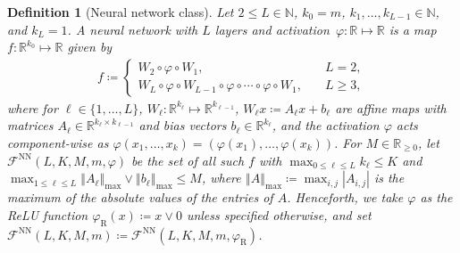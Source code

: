 \documentclass[a4paper,onecolumn,11pt,accepted=2026-05-12]{quantumarticle}
\newtheorem{definition}{Definition}
\newcommand{\norm}[1]{\left\Vert#1\right\Vert}
\newcommand{\abs}[1]{\left\vert#1\right\vert}
\newcommand{\cF}{\mathcal{F}}
\newcommand{\NN}{\mathbb{N}}
\newcommand{\RR}{\mathbb{R}}
\begin{document}
\begin{definition}[Neural network class]\label{Def:NNclass}
    Let $2 \leq L \in \NN$,  $k_0=m$, $k_1, \ldots, k_{L-1} \in \NN$,  and $ k_L=1 $.  
    A neural network with $L$ layers and activation~$\varphi\colon \RR \mapsto \RR$ is a map $f\colon \RR^{k_0} \mapsto \RR$ 
    given by 
    \begin{align}
        f\coloneqq \begin{cases}
            W_2\circ \varphi \circ W_1, &\quad L=2, \\
            W_L \circ \varphi \circ W_{L-1} \circ \varphi \circ \cdots \circ \varphi \circ W_1, & \quad L \geq 3,
        \end{cases}
    \end{align}
    where for $\ell \in \{1,\ldots,L\}$, $W_{\ell}\colon \RR^{k_{\ell}} \mapsto \RR^{k_{\ell-1}}$, $W_{\ell}x\coloneqq A_{\ell}x+b_{\ell}$ are affine maps with matrices $A_{\ell} \in \RR^{k_{\ell} \times k_{\ell-1}}$ and bias vectors $b_{\ell} \in \RR^{k_{\ell}}$, and the activation $\varphi$ acts component-wise as $\varphi(x_1,\ldots,x_k)=(\varphi(x_1),\ldots, \varphi(x_k))$. For $M \in \RR_{\geq 0}$, let $\cF^{\mathrm{NN}}(L,K,M,m,\varphi)$ be the set of all such  $f$ with  $\max_{0 \leq \ell \leq L} k_{\ell} \leq K$ and  $\max_{1 \leq \ell \leq L} \norm{A_{\ell}}_{\max} \vee  \norm{b_{\ell}}_{\max} \leq M$, where $\norm{A}_{\max}\coloneqq \max_{i,j}\abs{A_{i,j}}$ is the maximum of the absolute values of the entries of $A$.  Henceforth, we take $\varphi$ as the ReLU function $\varphi_{\mathrm{R}}(x)\coloneqq x \vee 0$ unless specified otherwise,  and  set $\cF^{\mathrm{NN}}(L,K,M,m)\coloneqq \cF^{\mathrm{NN}}(L,K,M,m,\varphi_{\mathrm{R}})$. 
\end{definition}
\end{document}
